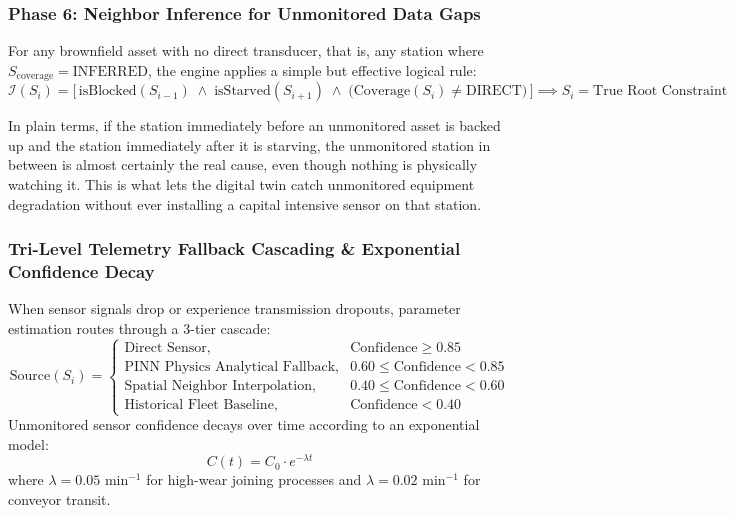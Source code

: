\documentclass[11pt]{article}
\begin{document}
\subsubsection{Phase 6: Neighbor Inference for Unmonitored Data Gaps}

For any brownfield asset with no direct transducer, that is, any station where $S_{\text{coverage}} = \text{INFERRED}$, the engine applies a simple but effective logical rule:
\begin{equation}
\mathcal{I}(S_i) = \Big[\, \text{isBlocked}(S_{i-1}) \;\wedge\; \text{isStarved}(S_{i+1}) \;\wedge\; \big(\text{Coverage}(S_i) \neq \text{DIRECT}\big) \,\Big] \implies S_i = \text{True Root Constraint}
\end{equation}

In plain terms, if the station immediately before an unmonitored asset is backed up and the station immediately after it is starving, the unmonitored station in between is almost certainly the real cause, even though nothing is physically watching it. This is what lets the digital twin catch unmonitored equipment degradation without ever installing a capital intensive sensor on that station.

\subsubsection{Tri-Level Telemetry Fallback Cascading \& Exponential Confidence Decay}

When sensor signals drop or experience transmission dropouts, parameter estimation routes through a 3-tier cascade:
\begin{equation}
\text{Source}(S_i) = 
\begin{cases}
\text{Direct Sensor}, & \text{Confidence} \ge 0.85 \\
\text{PINN Physics Analytical Fallback}, & 0.60 \le \text{Confidence} < 0.85 \\
\text{Spatial Neighbor Interpolation}, & 0.40 \le \text{Confidence} < 0.60 \\
\text{Historical Fleet Baseline}, & \text{Confidence} < 0.40
\end{cases}
\end{equation}
Unmonitored sensor confidence decays over time according to an exponential model:
\begin{equation}
C(t) = C_0 \cdot e^{-\lambda t}
\end{equation}
where $\lambda = 0.05\text{ min}^{-1}$ for high-wear joining processes and $\lambda = 0.02\text{ min}^{-1}$ for conveyor transit.
\end{document}
